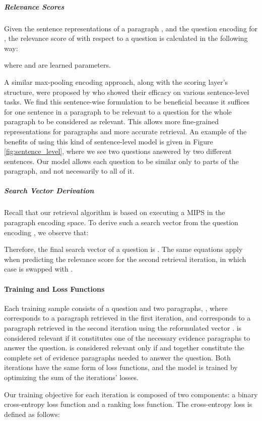 \documentclass[11pt,a4paper,dvipsnames]{article}
\begin{document}
\subparagraph{Relevance Scores}
Given the sentence representations  of a paragraph , and the question encoding  for , the relevance score of  with respect to a question  is calculated in the following way:

where  and  are  learned parameters. \par
A similar max-pooling encoding approach, along with the scoring layer's structure, were proposed by \citet{ConneauKSBB17snli} who showed their efficacy on various sentence-level tasks.
We find this sentence-wise formulation to be beneficial because it suffices for one sentence in a paragraph to be relevant to a question for the whole paragraph to be considered as relevant. This allows more fine-grained representations for paragraphs and more accurate retrieval. An example of the benefits of using this kind of sentence-level model is given in Figure \ref{fig:sentence_level}, where we see two questions answered by two different sentences. Our model allows each question to be similar only to parts of the paragraph, and not necessarily to all of it. \par
\subparagraph{Search Vector Derivation}
Recall that our retrieval algorithm is based on executing a MIPS in the paragraph encoding space. To derive such a search vector from the question encoding , we observe that:

Therefore, the final search vector of a question  is . The same equations apply when predicting the relevance score for the second retrieval iteration, in which case  is swapped with . 

\paragraph{Training and Loss Functions}
Each training sample consists of a question and two paragraphs, , where  corresponds to a paragraph retrieved in the first iteration, and  corresponds to a paragraph retrieved in the second iteration using the reformulated vector .  is considered relevant if it constitutes one of the necessary evidence paragraphs to answer the question.  is considered relevant only if  and  together constitute the complete set of evidence paragraphs needed to answer the question. Both iterations have the same form of loss functions, and the model is trained by optimizing the sum of the iterations' losses. \par
Our training objective for each iteration is composed of two components: a binary cross-entropy loss function and a ranking loss function.
The cross-entropy loss is defined as follows:
\end{document}
